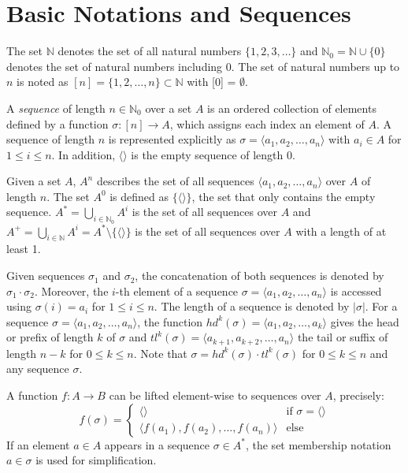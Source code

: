 \section{Basic Notations and Sequences}

The set $\mathbb{N}$ denotes the set of all natural numbers $\{1, 2, 3, \dots\}$ and $\mathbb{N}_0 = \mathbb{N} \cup \{0\}$ denotes the set of natural numbers including 0.
The set of natural numbers up to $n$ is noted as $[n] = \{1, 2, \dots, n\} \subset \mathbb{N}$ with [0] = $\emptyset$.

\begin{definition}[Sequence]
		A \textit{sequence} of length $n \in \mathbb{N}_0$ over a set $A$ is an ordered collection of elements defined by a function $\sigma \colon [n]\to A$, which assigns each index an element of $A$.
		A sequence  of length $n$ is represented explicitly as $\sigma = \langle a_1, a_2, \dots, a_n\rangle $ with $a_i \in A$ for $1 \leq i \leq n$. In addition, $\langle \rangle$ is the empty sequence of length $0$.
\end{definition}

Given a set $A$, $A^n$ describes the set of all sequences $\langle a_1, a_2, \dots, a_n\rangle$ over $A$ of length $n$.
The set $A^0$ is defined as $\{\langle \rangle\}$, the set that only contains the empty sequence.
$A^* = \bigcup\limits_{i\in \mathbb{N}_0} A^i$ is the set of all sequences over $A$ and $A^+ = \bigcup\limits_{i\in \mathbb{N}} A^i = A^* \setminus \{ \langle \rangle\}$ is the set of all sequences over $A$ with a length of at least 1.

Given sequences $\sigma_1$ and $\sigma_2$, the concatenation of both sequences is denoted by $\sigma_1 \cdot \sigma_2$.
Moreover, the $i$-th element of a sequence $\sigma = \langle a_1, a_2, \dots, a_n\rangle$ is accessed using $\sigma(i)= a_i$ for $1 \leq i \leq n$.
The length of a sequence is denoted by $|\sigma|$.
For a sequence $\sigma=\langle a_1, a_2, \dots, a_n\rangle$, the function
$hd^k(\sigma)= \langle a_1, a_2, \dots, a_k\rangle$ gives the head or prefix of length $k$ of $\sigma$ and $tl^k(\sigma)= \langle a_{k+1}, a_{k+2}, \dots, a_n\rangle$ the tail or suffix of length $n-k$ for $0 \leq k \leq n$.
Note that $\sigma = hd^k(\sigma) \cdot tl^{k}(\sigma)$ for $0 \leq k \leq n$ and any sequence $\sigma$.

A function $f \colon A \to B$ can be lifted element-wise to sequences over $A$, precisely:
\begin{equation*}
f(\sigma) =
\begin{cases}
\langle \rangle & \text{if $\sigma = \langle \rangle$} \\
\langle f(a_1), f(a_2), \dots, f(a_n)\rangle & \text{else} 
\end{cases}
\end{equation*}
If an element $a \in A$ appears in a sequence $\sigma \in A^*$, the set membership notation $a \in \sigma$ is used for simplification.


